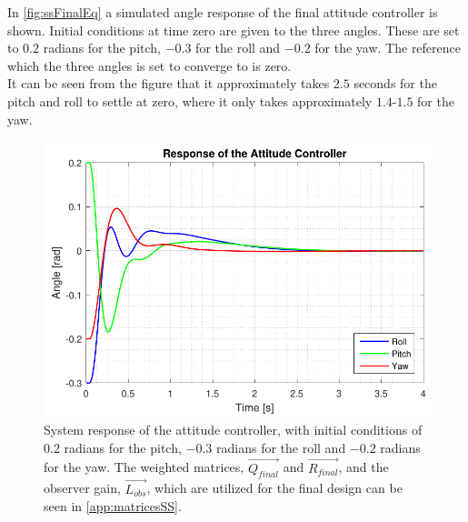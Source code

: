 In \autoref{fig:ssFinalEq} a simulated angle response of the final attitude controller is shown. Initial conditions at time zero are given to the three angles. These are set to $0.2$ radians for the pitch, $-0.3$ for the roll and $-0.2$ for the yaw. The reference which the three angles is set to converge to is zero. \\ It can be seen from the figure that it approximately takes $2.5$ seconds for the pitch and roll to settle at zero, where it only takes approximately $1.4$-$1.5$ for the yaw.
%
\begin{figure}[H]
	\centering
	\includegraphics[scale=0.8]{figures/ssFinalEq.pdf}
	\caption{System response of the attitude controller, with initial conditions of $0.2$ radians for the pitch, $-0.3$ radians for the roll and $-0.2$ radians for the yaw. The weighted matrices, $\vec{Q_{final}}$ and $\vec{R_{final}}$, and the observer gain, $\vec{L_{obs}}$, which are utilized for the final design can be seen in \autoref{app:matricesSS}.}
	\label{fig:ssFinalEq}
\end{figure}
%
